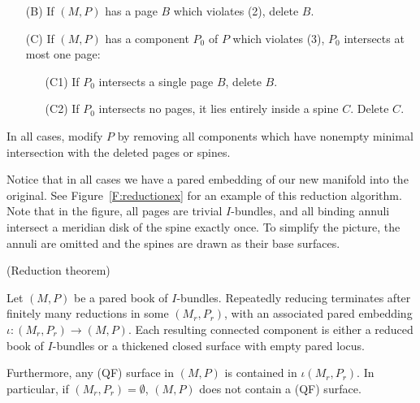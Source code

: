 \begin{defn}
\begin{enumerate}
\begin{enumerate}
\end{enumerate}

\item[(B)] If $(M,P)$ has a page $B$ which violates (2), delete $B$.

\item[(C)] If $(M,P)$ has a component $P_0$ of $P$ which violates (3), $P_0$
intersects at most one page:

\begin{enumerate}

\item[(C1)] If $P_0$ intersects a single page $B$, delete $B$.

\item[(C2)] If $P_0$ intersects no pages, it lies entirely inside a spine $C$.
Delete $C$.

\end{enumerate}

\end{enumerate}

In all cases, modify $P$ by removing all components which have nonempty minimal
intersection with the deleted pages or spines.

\end{defn}

Notice that in all cases we have a pared embedding of our new manifold into the
original. See Figure~\ref{F:reductionex} for an example of this reduction
algorithm. Note that in the figure, all pages are trivial $I$-bundles, and all
binding annuli intersect a meridian disk of the spine exactly once. To simplify
the picture, the annuli are omitted and the spines are drawn as their base
surfaces.


\begin{thm}(Reduction theorem)

Let $(M,P)$ be a pared book of $I$-bundles. Repeatedly reducing terminates
after finitely many reductions in some $(M_r,P_r)$, with an associated pared
embedding $\iota\colon (M_r,P_r) \to (M,P)$. Each resulting connected component
is either a reduced book of $I$-bundles or a thickened closed surface with
empty pared locus.

Furthermore, any (QF) surface in $(M,P)$ is contained in $\iota(M_r,P_r)$. In
particular, if $(M_r,P_r)=\emptyset$, $(M,P)$ does not contain a (QF) surface.

\end{thm}


